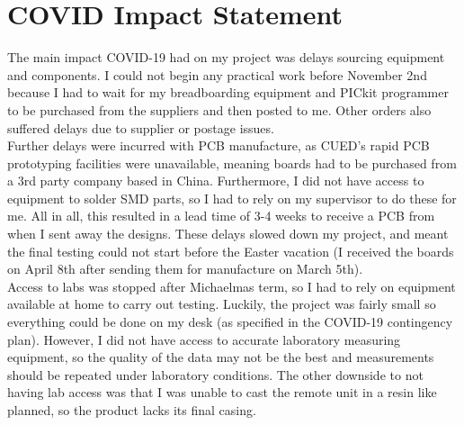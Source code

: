 \newpage
\onehalfspacing
\section{COVID Impact Statement}
The main impact COVID-19 had on my project was delays sourcing equipment and components. I could not begin any practical work before November 2nd because I had to wait for my breadboarding equipment and PICkit programmer to be purchased from the suppliers and then posted to me. Other orders also suffered delays due to supplier or postage issues.\\

Further delays were incurred with PCB manufacture, as CUED's rapid PCB prototyping facilities were unavailable, meaning boards had to be purchased from a 3rd party company based in China. Furthermore, I did not have access to equipment to solder SMD parts, so I had to rely on my supervisor to do these for me. All in all, this resulted in a lead time of 3-4 weeks to receive a PCB from when I sent away the designs. These delays slowed down my project, and meant the final testing could not start before the Easter vacation (I received the boards on April 8th after sending them for manufacture on March 5th).\\

Access to labs was stopped after Michaelmas term, so I had to rely on equipment available at home to carry out testing. Luckily, the project was fairly small so everything could be done on my desk (as specified in the COVID-19 contingency plan). However, I did not have access to accurate laboratory measuring equipment, so the quality of the data may not be the best and measurements should be repeated under laboratory conditions. The other downside to not having lab access was that I was unable to cast the remote unit in a resin like planned, so the product lacks its final casing.




